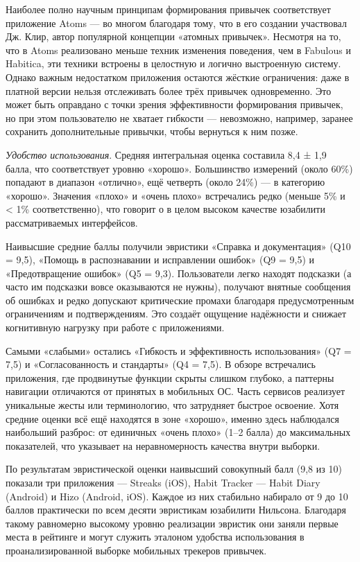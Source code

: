\documentclass[pdflatex,sn-mathphys-num]{sn-jnl}%
\theoremstyle{thmstyleone}%
\theoremstyle{thmstyletwo}%
\theoremstyle{thmstylethree}%
\begin{document}
Наиболее полно научным принципам формирования привычек соответствует приложение Atoms — во многом благодаря тому, что в его создании участвовал Дж. Клир, автор популярной концепции «атомных привычек». Несмотря на то, что в Atoms реализовано меньше техник изменения поведения, чем в Fabulous и Habitica, эти техники встроены в целостную и логично выстроенную систему. Однако важным недостатком приложения остаются жёсткие ограничения: даже в платной версии нельзя отслеживать более трёх привычек одновременно. Это может быть оправдано с точки зрения эффективности формирования привычек, но при этом пользователю не хватает гибкости — невозможно, например, заранее сохранить дополнительные привычки, чтобы вернуться к ним позже.

\textit{Удобство использования}. Средняя интегральная оценка составила 8,4 ± 1,9 балла, что соответствует уровню «хорошо». Большинство измерений (около 60\%) попадают в диапазон «отлично», ещё четверть (около 24\%) — в категорию «хорошо». Значения «плохо» и «очень плохо» встречались редко (меньше 5\% и < 1\% соответственно), что говорит о в целом высоком качестве юзабилити рассматриваемых интерфейсов. 

Наивысшие средние баллы получили эвристики «Справка и документация» (Q10 = 9,5), «Помощь в распознавании и исправлении ошибок» (Q9 = 9,5) и «Предотвращение ошибок» (Q5 = 9,3). Пользователи легко находят подсказки (а часто им подсказки вовсе оказываются не нужны), получают внятные сообщения об ошибках и редко допускают критические промахи благодаря предусмотренным ограничениям и подтверждениям. Это создаёт ощущение надёжности и снижает когнитивную нагрузку при работе с приложениями.

Самыми «слабыми» остались «Гибкость и эффективность использования» (Q7 = 7,5) и «Согласованность и стандарты» (Q4 = 7,5). В обзоре встречались приложения, где продвинутые функции скрыты слишком глубоко, а паттерны навигации отличаются от принятых в мобильных ОС. Часть сервисов реализует уникальные жесты или терминологию, что затрудняет быстрое освоение. Хотя средние оценки всё ещё находятся в зоне «хорошо», именно здесь наблюдался наибольший разброс: от единичных «очень плохо» (1–2 балла) до максимальных показателей, что указывает на неравномерность качества внутри выборки. 

По результатам эвристической оценки наивысший совокупный балл (9,8 из 10) показали три приложения — Streaks (iOS), Habit Tracker — Habit Diary (Android) и Hizo (Android, iOS). Каждое из них стабильно набирало от 9 до 10 баллов практически по всем десяти эвристикам юзабилити Нильсона. Благодаря такому равномерно высокому уровню реализации эвристик они заняли первые места в рейтинге и могут служить эталоном удобства использования в проанализированной выборке мобильных трекеров привычек.
\end{document}
